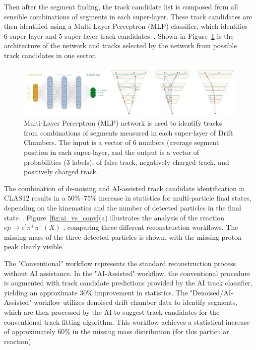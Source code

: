 \documentclass[preprint,12pt]{elsarticle}
\begin{document}
Then after the segment finding, the track candidate list is composed from all sensible combinations of segments in each super-layer.
These track candidates are then identified using a Multi-Layer Perceptron (MLP) classifier,
which identifies 6-super-layer and 5-super-layer track candidates~\cite{Gavalian:2020oxg}. Shown in Figure~\ref{fig:trackfinder} is 
the architecture of the network and tracks selected by the network from possible track candidates in one sector.

\begin{figure}[h!]
\centering
\includegraphics[width=0.85\columnwidth]{images/track_finder.png}
\caption{Multi-Layer Perceptron (MLP) network is used to identify tracks from combinations of segments measured in each super-layer of Drift Chambers. The input is a vector
of 6 numbers (average segment position in each super-layer, and the output is a vector of probabilities (3 labels), of false track, negatively charged track, and positively charged track. } 
\label{fig:trackfinder}
\end{figure}
The combination of de-noising and AI-assisted track candidate identification in CLAS12 results in a $50\%–75\%$ increase in statistics for multi-particle final states, depending on the kinematics and the number of detected particles in the final state~\cite{Gavalian:2020xmc}. Figure~\ref{fig:ai_vs_conv}(a) illustrates the analysis of the reaction $ep\rightarrow e^\prime\pi^+\pi^-(X)$ , comparing three different reconstruction workflows. The missing mass of the three detected particles is shown, with the missing proton peak clearly visible.

The "Conventional" workflow represents the standard reconstruction process without AI assistance. In the "AI-Assisted" workflow, the conventional procedure is augmented with track candidate predictions provided by the AI track classifier, yielding an approximate $30\%$ improvement in statistics. The "Denoised/AI-Assisted" workflow utilizes denoised drift chamber 
data to identify segments, which are then processed by the AI to suggest track candidates for the conventional track fitting algorithm. This workflow achieves a statistical increase of approximately $60\%$ in the missing mass distribution (for this particular reaction).
\end{document}
